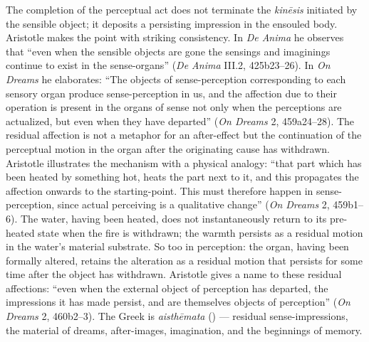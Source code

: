 The completion of the perceptual act does not terminate the \textit{kinēsis} initiated by the sensible object; it deposits a persisting impression in the ensouled body. Aristotle makes the point with striking consistency. In \textit{De Anima} he observes that ``even when the sensible objects are gone the sensings and imaginings continue to exist in the sense-organs'' (\textit{De Anima} III.2, 425b23--26). In \textit{On Dreams} he elaborates: ``The objects of sense-perception corresponding to each sensory organ produce sense-perception in us, and the affection due to their operation is present in the organs of sense not only when the perceptions are actualized, but even when they have departed'' (\textit{On Dreams} 2, 459a24--28). The residual affection is not a metaphor for an after-effect but the continuation of the perceptual motion in the organ after the originating cause has withdrawn. Aristotle illustrates the mechanism with a physical analogy: ``that part which has been heated by something hot, heats the part next to it, and this propagates the affection onwards to the starting-point. This must therefore happen in sense-perception, since actual perceiving is a qualitative change'' (\textit{On Dreams} 2, 459b1--6). The water, having been heated, does not instantaneously return to its pre-heated state when the fire is withdrawn; the warmth persists as a residual motion in the water's material substrate. So too in perception: the organ, having been formally altered, retains the alteration as a residual motion that persists for some time after the object has withdrawn. Aristotle gives a name to these residual affections: ``even when the external object of perception has departed, the impressions it has made persist, and are themselves objects of perception'' (\textit{On Dreams} 2, 460b2--3). The Greek is \textit{aisthēmata} () --- residual sense-impressions, the material of dreams, after-images, imagination, and the beginnings of memory.

